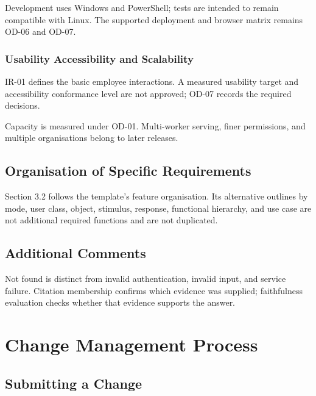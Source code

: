 \documentclass[11pt,letterpaper]{article}
\begin{document}
\endgroup

Development uses Windows and PowerShell; tests are intended to remain compatible with Linux. The supported deployment and browser matrix remains OD-06 and OD-07.\par

\subsubsection{Usability Accessibility and Scalability}

IR-01 defines the basic employee interactions. A measured usability target and accessibility conformance level are not approved; OD-07 records the required decisions.\par

Capacity is measured under OD-01. Multi-worker serving, finer permissions, and multiple organisations belong to later releases.\par

\subsection{Organisation of Specific Requirements}

Section 3.2 follows the template's feature organisation. Its alternative outlines by mode, user class, object, stimulus, response, functional hierarchy, and use case are not additional required functions and are not duplicated.\par

\subsection{Additional Comments}

Not found is distinct from invalid authentication, invalid input, and service failure. Citation membership confirms which evidence was supplied; faithfulness evaluation checks whether that evidence supports the answer.\par

\clearpage

\section{Change Management Process}

\subsection{Submitting a Change}
\end{document}
